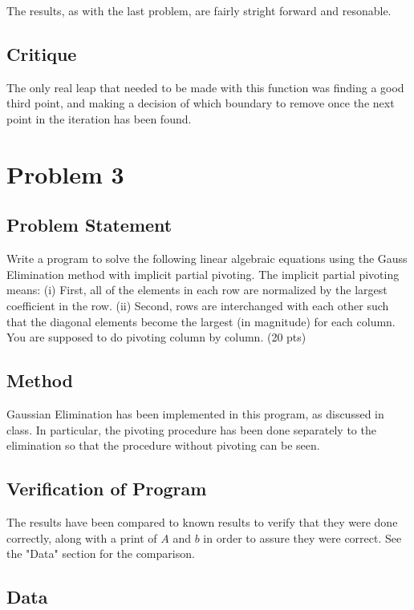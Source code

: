 \documentclass[10pt,letter]{article}
\begin{document}
The results, as with the last problem, are fairly stright forward and resonable.

\subsection{Critique}

The only real leap that needed to be made with this function was finding a good third point, and making a decision of which boundary to remove once the next point in the iteration has been found.

\pagebreak

\section{Problem 3}

\subsection{Problem Statement}

Write a program to solve the following linear algebraic equations using the Gauss Elimination method
with implicit partial pivoting. The implicit partial pivoting means: 
(i) First, all of the elements in
each row are normalized by the largest coefficient in the row. 
(ii) Second, rows are interchanged with
each other such that the diagonal elements become the largest (in magnitude) for each column. You
are supposed to do pivoting column by column. (20 pts)

\subsection{Method}

Gaussian Elimination has been implemented in this program, as discussed in class. In particular, the pivoting procedure has been done separately to the elimination so that the procedure without pivoting can be seen.

\subsection{Verification of Program}

The results have been compared to known results to verify that they were done correctly, along with a print of $A$ and $b$ in order to assure they were correct. See the "Data" section for the comparison.

\subsection{Data}
\end{document}
